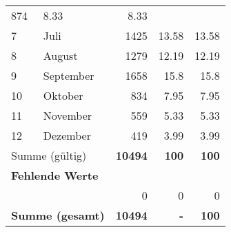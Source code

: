 \begin{longtable}{lXrrr}
       \num{874} &
       \num[round-mode=places,round-precision=2]{8,33} &
         \num[round-mode=places,round-precision=2]{8,33} \\

     7 &
     \multicolumn{1}{X}{ Juli   } &


       \num{1425} &
       \num[round-mode=places,round-precision=2]{13,58} &
         \num[round-mode=places,round-precision=2]{13,58} \\

     8 &
     \multicolumn{1}{X}{ August   } &


       \num{1279} &
       \num[round-mode=places,round-precision=2]{12,19} &
         \num[round-mode=places,round-precision=2]{12,19} \\

     9 &
     \multicolumn{1}{X}{ September   } &


       \num{1658} &
       \num[round-mode=places,round-precision=2]{15,8} &
         \num[round-mode=places,round-precision=2]{15,8} \\

     10 &
     \multicolumn{1}{X}{ Oktober   } &


       \num{834} &
       \num[round-mode=places,round-precision=2]{7,95} &
         \num[round-mode=places,round-precision=2]{7,95} \\

     11 &
     \multicolumn{1}{X}{ November   } &


       \num{559} &
       \num[round-mode=places,round-precision=2]{5,33} &
         \num[round-mode=places,round-precision=2]{5,33} \\

     12 &
     \multicolumn{1}{X}{ Dezember   } &


       \num{419} &
       \num[round-mode=places,round-precision=2]{3,99} &
         \num[round-mode=places,round-precision=2]{3,99} \\
     \midrule
     \multicolumn{2}{l}{Summe (gültig)} &
       \textbf{\num{10494}} &
     \textbf{100} &
       \textbf{\num[round-mode=places,round-precision=2]{100}} \\
     \multicolumn{5}{l}{\textbf{Fehlende Werte}}\\
      & & 0 & 0 & 0 \\
     \midrule
     \multicolumn{2}{l}{\textbf{Summe (gesamt)}} &
          \textbf{\num{10494}} &
        \textbf{-} &
        \textbf{100} \\
     \bottomrule
     \end{longtable}
     
